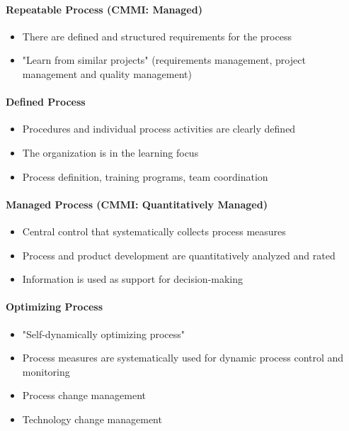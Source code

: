 \documentclass[11pt,a4paper]{article}
\begin{document}
\paragraph {Repeatable Process (CMMI: Managed)}
\begin {itemize} 
\item There are defined and structured requirements for the process
\item "Learn from similar projects" (requirements management, project
  management and quality management)
\end {itemize}

\paragraph {Defined Process}
\begin {itemize} 
\item Procedures and individual process activities are clearly defined
\item The organization is in the learning focus
\item Process definition, training programs, team coordination
\end {itemize}

\paragraph {Managed Process (CMMI: Quantitatively Managed)}
\begin {itemize} 
\item Central control that systematically collects process measures
\item Process and product development are quantitatively analyzed and rated
\item Information is used as support for decision-making 
\end {itemize}

\paragraph {Optimizing Process}
\begin {itemize} 
\item "Self-dynamically optimizing process" 
\item Process measures are systematically used for dynamic process control and
  monitoring
\item Process change management
\item Technology change management
\end {itemize}
\end{document}
